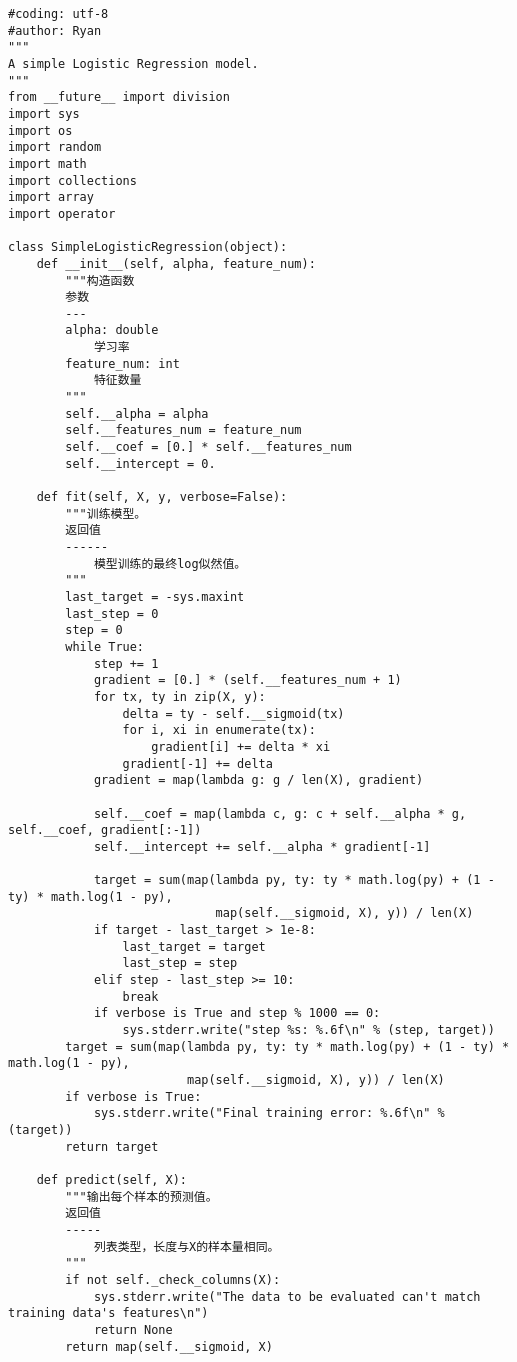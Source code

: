 \documentclass[10pt,a4paper]{ctexbook}
\begin{document}
\begin{verbatim}
#coding: utf-8
#author: Ryan
"""
A simple Logistic Regression model.
"""
from __future__ import division
import sys
import os
import random
import math
import collections
import array
import operator

class SimpleLogisticRegression(object):
    def __init__(self, alpha, feature_num):
        """构造函数
        参数
        ---
        alpha: double
            学习率
        feature_num: int
            特征数量
        """
        self.__alpha = alpha
        self.__features_num = feature_num
        self.__coef = [0.] * self.__features_num
        self.__intercept = 0.

    def fit(self, X, y, verbose=False):
        """训练模型。
        返回值
        ------
            模型训练的最终log似然值。
        """
        last_target = -sys.maxint
        last_step = 0
        step = 0
        while True:
            step += 1
            gradient = [0.] * (self.__features_num + 1)
            for tx, ty in zip(X, y):
                delta = ty - self.__sigmoid(tx)
                for i, xi in enumerate(tx):
                    gradient[i] += delta * xi
                gradient[-1] += delta
            gradient = map(lambda g: g / len(X), gradient)

            self.__coef = map(lambda c, g: c + self.__alpha * g, self.__coef, gradient[:-1])
            self.__intercept += self.__alpha * gradient[-1]

            target = sum(map(lambda py, ty: ty * math.log(py) + (1 - ty) * math.log(1 - py),
                             map(self.__sigmoid, X), y)) / len(X)
            if target - last_target > 1e-8:
                last_target = target
                last_step = step
            elif step - last_step >= 10:
                break
            if verbose is True and step % 1000 == 0:
                sys.stderr.write("step %s: %.6f\n" % (step, target))
        target = sum(map(lambda py, ty: ty * math.log(py) + (1 - ty) * math.log(1 - py),
                         map(self.__sigmoid, X), y)) / len(X)
        if verbose is True:
            sys.stderr.write("Final training error: %.6f\n" % (target))
        return target

    def predict(self, X):
        """输出每个样本的预测值。
        返回值
        -----
            列表类型，长度与X的样本量相同。
        """
        if not self._check_columns(X):
            sys.stderr.write("The data to be evaluated can't match training data's features\n")
            return None
        return map(self.__sigmoid, X)


\end{verbatim}
\end{document}
